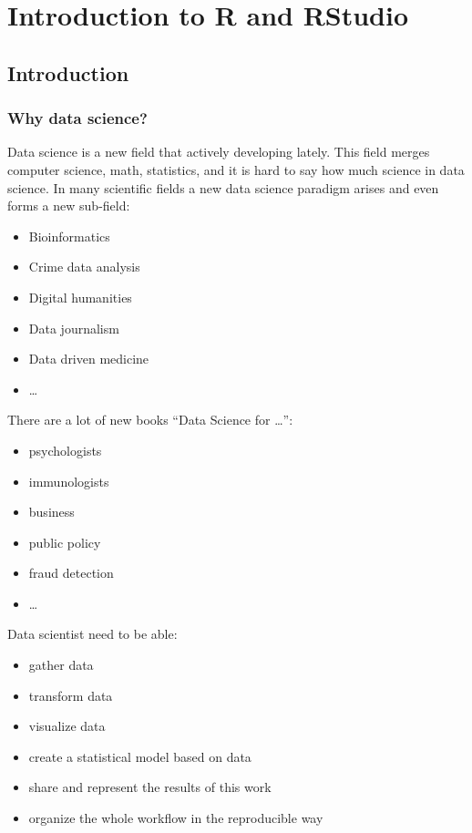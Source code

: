 \documentclass[
]{book}
\providecommand{\tightlist}{%
  \setlength{\itemsep}{0pt}\setlength{\parskip}{0pt}}
\begin{document}
\hypertarget{intro}{%
\chapter{Introduction to R and RStudio}\label{intro}}

\hypertarget{introduction}{%
\section{Introduction}\label{introduction}}

\hypertarget{why-data-science}{%
\subsection{Why data science?}\label{why-data-science}}

Data science is a new field that actively developing lately. This field merges computer science, math, statistics, and it is hard to say how much science in data science. In many scientific fields a new data science paradigm arises and even forms a new sub-field:

\begin{itemize}
\tightlist
\item
  Bioinformatics
\item
  Crime data analysis
\item
  Digital humanities
\item
  Data journalism
\item
  Data driven medicine
\item
  \ldots{}
\end{itemize}

There are a lot of new books ``Data Science for \ldots{}'':

\begin{itemize}
\tightlist
\item
  psychologists \citep{hansjoerg19}
\item
  immunologists \citep{thomas19}
\item
  business \citep{provost13}
\item
  public policy \citep{brooks13}
\item
  fraud detection \citep{baesens15}
\item
  \ldots{}
\end{itemize}

Data scientist need to be able:

\begin{itemize}
\tightlist
\item
  gather data
\item
  transform data
\item
  visualize data
\item
  create a statistical model based on data
\item
  share and represent the results of this work
\item
  organize the whole workflow in the reproducible way
\end{itemize}
\end{document}
